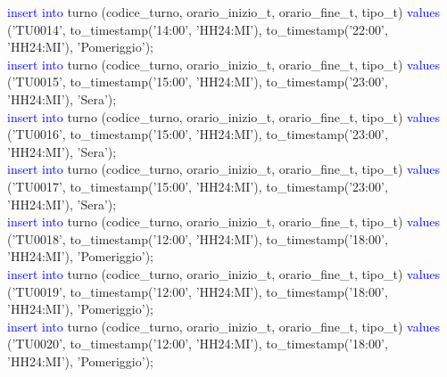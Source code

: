 \documentclass{article}
\begin{document}
\begin{flushleft}
{        \hspace*{0.5em}\textcolor{blue}{insert into} turno (codice\_turno, orario\_inizio\_t, orario\_fine\_t, tipo\_t) \textcolor{blue}{values} \hspace*{0.5em}('TU0014', to\_timestamp('14:00', 'HH24:MI'), to\_timestamp('22:00', 'HH24:MI'), \hspace*{0.5em}'Pomeriggio'); \\
        \hspace*{0.5em}\textcolor{blue}{insert into} turno (codice\_turno, orario\_inizio\_t, orario\_fine\_t, tipo\_t) \textcolor{blue}{values} \hspace*{0.5em}('TU0015', to\_timestamp('15:00', 'HH24:MI'), to\_timestamp('23:00', 'HH24:MI'), \hspace*{0.5em}'Sera'); \\
        \hspace*{0.5em}\textcolor{blue}{insert into} turno (codice\_turno, orario\_inizio\_t, orario\_fine\_t, tipo\_t) \textcolor{blue}{values} \hspace*{0.5em}('TU0016', to\_timestamp('15:00', 'HH24:MI'), to\_timestamp('23:00', 'HH24:MI'), \hspace*{0.5em}'Sera'); \\
        \hspace*{0.5em}\textcolor{blue}{insert into} turno (codice\_turno, orario\_inizio\_t, orario\_fine\_t, tipo\_t) \textcolor{blue}{values} \hspace*{0.5em}('TU0017', to\_timestamp('15:00', 'HH24:MI'), to\_timestamp('23:00', 'HH24:MI'), \hspace*{0.5em}'Sera'); \\
        \hspace*{0.5em}\textcolor{blue}{insert into} turno (codice\_turno, orario\_inizio\_t, orario\_fine\_t, tipo\_t) \textcolor{blue}{values} \hspace*{0.5em}('TU0018', to\_timestamp('12:00', 'HH24:MI'), to\_timestamp('18:00', 'HH24:MI'), \hspace*{0.5em}'Pomeriggio'); \\
        \hspace*{0.5em}\textcolor{blue}{insert into} turno (codice\_turno, orario\_inizio\_t, orario\_fine\_t, tipo\_t) \textcolor{blue}{values} \hspace*{0.5em}('TU0019', to\_timestamp('12:00', 'HH24:MI'), to\_timestamp('18:00', 'HH24:MI'), \hspace*{0.5em}'Pomeriggio'); \\
        \hspace*{0.5em}\textcolor{blue}{insert into} turno (codice\_turno, orario\_inizio\_t, orario\_fine\_t, tipo\_t) \textcolor{blue}{values} \hspace*{0.5em}('TU0020', to\_timestamp('12:00', 'HH24:MI'), to\_timestamp('18:00', 'HH24:MI'), \hspace*{0.5em}'Pomeriggio'); \\
}
\end{flushleft}
\end{document}
